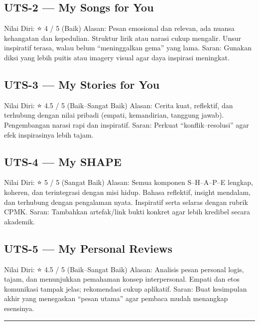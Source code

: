 \documentclass[
  letterpaper,
  DIV=11,
  numbers=noendperiod]{scrreprt}
\begin{document}
\subsection{UTS-2 --- My Songs for You}\label{uts-2-my-songs-for-you-1}

Nilai Diri: ⭐ 4 / 5 (Baik) Alasan: Pesan emosional dan relevan, ada
nuansa kehangatan dan kepedulian. Struktur lirik atau narasi cukup
mengalir. Unsur inspiratif terasa, walau belum ``meninggalkan gema''
yang lama. Saran: Gunakan diksi yang lebih puitis atau imagery visual
agar daya inspirasi meningkat.

\subsection{UTS-3 --- My Stories for
You}\label{uts-3-my-stories-for-you-1}

Nilai Diri: ⭐ 4.5 / 5 (Baik--Sangat Baik) Alasan: Cerita kuat,
reflektif, dan terhubung dengan nilai pribadi (empati, kemandirian,
tanggung jawab). Pengembangan narasi rapi dan inspiratif. Saran: Perkuat
``konflik--resolusi'' agar efek inspirasinya lebih tajam.

\subsection{UTS-4 --- My SHAPE}\label{uts-4-my-shape}

Nilai Diri: ⭐ 5 / 5 (Sangat Baik) Alasan: Semua komponen S--H--A--P--E
lengkap, koheren, dan terintegrasi dengan misi hidup. Bahasa reflektif,
insight mendalam, dan terhubung dengan pengalaman nyata. Inspiratif
serta selaras dengan rubrik CPMK. Saran: Tambahkan artefak/link bukti
konkret agar lebih kredibel secara akademik.

\subsection{UTS-5 --- My Personal
Reviews}\label{uts-5-my-personal-reviews-1}

Nilai Diri: ⭐ 4.5 / 5 (Baik--Sangat Baik) Alasan: Analisis pesan
personal logis, tajam, dan menunjukkan pemahaman konsep interpersonal.
Empati dan etos komunikasi tampak jelas; rekomendasi cukup aplikatif.
Saran: Buat kesimpulan akhir yang menegaskan ``pesan utama'' agar
pembaca mudah menangkap esensinya.

\begin{center}\rule{0.5\linewidth}{0.5pt}\end{center}
\end{document}
